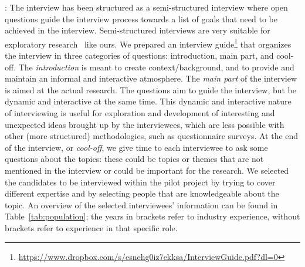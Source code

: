 : The interview has been structured as a semi-structured interview where open questions guide the interview process towards a list of goals that need to be achieved in the interview. Semi-structured interviews are very suitable for exploratory research~\cite{Runeson:2009:GCR:1519313.1519324} %
{like ours}. 
We prepared an interview guide\footnote{\url{https://www.dropbox.com/s/esnehg0iz7ekksa/InterviewGuide.pdf?dl=0}} that organizes the interview in three categories of questions: introduction, main %
{part}, and cool-off.
The {\em introduction} is meant to create context/background, and to provide and maintain an informal and interactive atmosphere. %
The {\em main part} of the interview is aimed at the actual research. The questions aim to guide the interview, but be dynamic and interactive at the same time. This dynamic and interactive nature of interviewing is useful for exploration and development of interesting and unexpected ideas brought up by the interviewees, which are less possible with other (more structured) methodologies, such as questionnaire surveys.
At the end of the interview, or {\em cool-off}, we give time to each interviewee to ask some questions about the topics: these could be topics or themes that are not mentioned in the interview or could be important for the research. We selected the candidates to be interviewed within the pilot project by trying to cover different expertise and by selecting people that are knowledgeable about the topic.
An overview of the selected interviewees' information can be found in Table~\ref{tab:population}; the years in brackets refer to industry experience, without brackets refer to experience in that specific role. 

